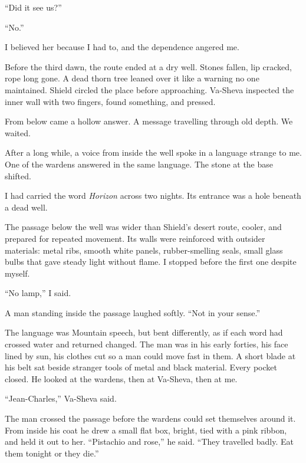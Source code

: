 ``Did it see us?''\par

``No.''\par

I believed her because I had to, and the dependence angered me.\par

Before the third dawn, the route ended at a dry well. Stones fallen, lip cracked, rope long gone. A dead thorn tree leaned over it like a warning no one maintained. Shield circled the place before approaching. Va-Sheva inspected the inner wall with two fingers, found something, and pressed.\par

From below came a hollow answer. A message travelling through old depth. We waited.\par

After a long while, a voice from inside the well spoke in a language strange to me. One of the wardens answered in the same language. The stone at the base shifted.\par

I had carried the word \textit{Horizon} across two nights. Its entrance was a hole beneath a dead well.\par

The passage below the well was wider than Shield's desert route, cooler, and prepared for repeated movement. Its walls were reinforced with outsider materials: metal ribs, smooth white panels, rubber-smelling seals, small glass bulbs that gave steady light without flame. I stopped before the first one despite myself.\par

``No lamp,'' I said.\par

A man standing inside the passage laughed softly. ``Not in your sense.''\par

The language was Mountain speech, but bent differently, as if each word had crossed water and returned changed. The man was in his early forties, his face lined by sun, his clothes cut so a man could move fast in them. A short blade at his belt sat beside stranger tools of metal and black material. Every pocket closed. He looked at the wardens, then at Va-Sheva, then at me.\par

``Jean-Charles,'' Va-Sheva said.\par

The man crossed the passage before the wardens could set themselves around it. From inside his coat he drew a small flat box, bright, tied with a pink ribbon, and held it out to her. ``Pistachio and rose,'' he said. ``They travelled badly. Eat them tonight or they die.''\par

